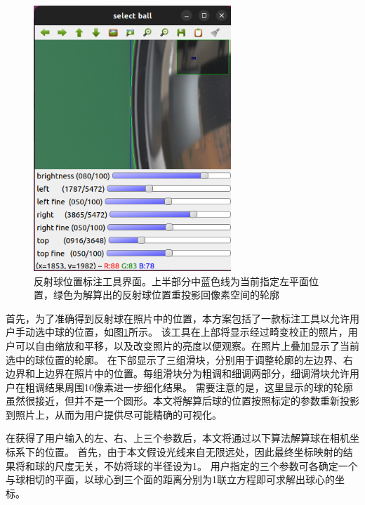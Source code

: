 \begin{figure}
\centering
\includegraphics[height=10cm]{figures/sphere_locator}
\caption[反射球位置标注工具界面]{反射球位置标注工具界面。上半部分中蓝色线为当前指定左平面位置，绿色为解算出的反射球位置重投影回像素空间的轮廓}
\label{fig:sphere_locator}
\end{figure}
首先，为了准确得到反射球在照片中的位置，本方案包括了一款标注工具以允许用户手动选中球的位置，如图\ref{fig:sphere_locator}所示。
该工具在上部将显示经过畸变校正的照片，用户可以自由缩放和平移，以及改变照片的亮度以便观察。在照片上叠加显示了当前选中的球位置的轮廓。
在下部显示了三组滑块，分别用于调整轮廓的左边界、右边界和上边界在照片中的位置。每组滑块分为粗调和细调两部分，细调滑块允许用户在粗调结果周围10像素进一步细化结果。
需要注意的是，这里显示的球的轮廓虽然很接近，但并不是一个圆形。本文将解算后球的位置按照标定的参数重新投影到照片上，从而为用户提供尽可能精确的可视化。

在获得了用户输入的左、右、上三个参数后，本文将通过以下算法解算球在相机坐标系下的位置。
首先，由于本文假设光线来自无限远处，因此最终坐标映射的结果将和球的尺度无关，不妨将球的半径设为1。
用户指定的三个参数可各确定一个与球相切的平面，以球心到三个面的距离分别为1联立方程即可求解出球心的坐标。

